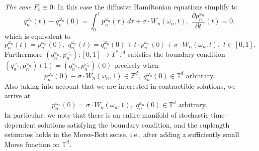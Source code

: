 \documentclass[a4paper,11pt]{amsart}
\newcommand{\ZZ}{\mathbb{Z}}
\newcommand{\TT}{\mathbb{T}}
\begin{document}
\noindent\emph{The case $F_t\equiv 0$:} In this case the diffusive Hamiltonian equations simplify to \[q_n^{\omega_n}(t)-q_n^{\omega_n}(0)=\int_0^t p_n^{\omega_n}(\tau)\,d\tau +\sigma\cdot W_n(\omega_n,t),\,\,\frac{\partial p_n^{\omega_n}}{\partial t}(t)=0,\] which is equivalent to \[p_n^{\omega_n}(t)=p_n^{\omega_n}(0),\,\, q_n^{\omega_n}(t)=q_n^{\omega_n}(0)+t\cdot p_n^{\omega_n}(0)+\sigma\cdot W_n(\omega_n,t),\,\,t\in [0,1].\] Furthermore $(q_n^{\omega_n},p_n^{\omega_n}):[0,1]\to T^*\TT^d$ satisfies the boundary condition $(q_n^{\omega_n},p_n^{\omega_n})(1)=(q_n^{\omega_n},p_n^{\omega_n})(0)$ precisely when \[p_n^{\omega_n}(0)-\sigma\cdot W_n(\omega_n,1)\in\ZZ^d,\,\,q_n^{\omega_n}(0)\in\TT^d\,\,\textrm{arbitrary.}\] Also taking into account that we are interested in contractible solutions, we arrive at \[p_n^{\omega_n}(0)=\sigma\cdot W_n(\omega_n,1),\,\,q_n^{\omega_n}(0)\in\TT^d\,\,\textrm{arbitrary.}\]
In particular, we note that there is an entire manifold of stochastic time-dependent solutions satisfying the boundary condition, and the cuplength estimates holds in the Morse-Bott sense, i.e., after adding a sufficiently small Morse function on $\TT^d$.\\
\end{document}
